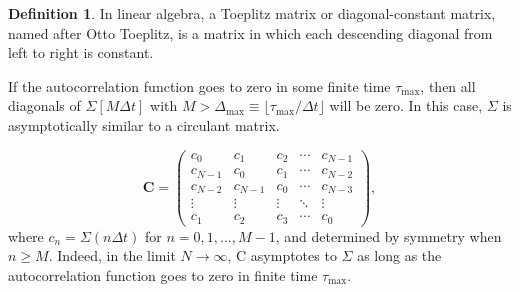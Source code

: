 \documentclass[12pt, a4paper]{article}
\newcounter{lecture}              %
\theoremstyle{plain} %
\theoremstyle{definition} %
\newtheorem{definition}{Definition}[lecture]
\begin{document}
\begin{definition}
    In linear algebra, a Toeplitz matrix or diagonal-constant matrix, named after Otto Toeplitz, is a matrix in which each descending diagonal from left to right is constant.
\end{definition}

If the autocorrelation function goes to zero in some finite time $\tau_{\text{max}}$, then all diagonals of $\Sigma[M\Delta t]$ with $M > \Delta_{\text{max}} \equiv \lfloor \tau_{\text{max}} / \Delta t \rfloor$ will be zero. In this case, $\Sigma$ is asymptotically similar to a circulant matrix.

\begin{equation}
    \mathbf{C} = \begin{pmatrix}
    c_0 & c_1 & c_2 & \cdots & c_{N-1} \\
    c_{N-1} & c_0 & c_1 & \cdots & c_{N-2} \\
    c_{N-2} & c_{N-1} & c_0 & \cdots & c_{N-3} \\
    \vdots & \vdots & \vdots & \ddots & \vdots \\
    c_1 & c_2 & c_3 & \cdots & c_0
    \end{pmatrix},
\end{equation}
where $c_n = \Sigma(n \Delta t)$ for $n = 0, 1, ..., M-1$, and determined by symmetry when $n \geq M$. Indeed, in the limit $N\rightarrow\infty$, C asymptotes to $\Sigma$ as long as the autocorrelation function goes to zero in finite time $\tau_\mathrm{max}$.
\end{document}
